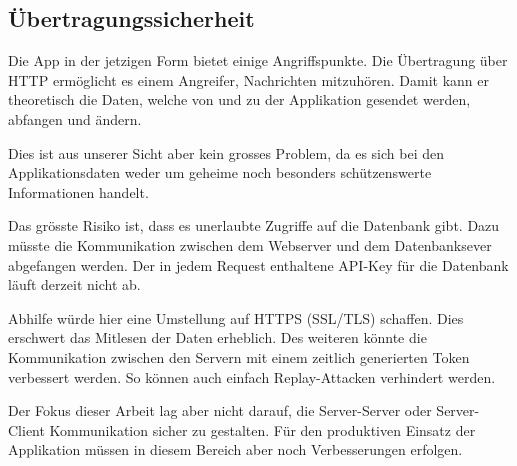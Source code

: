 \subsection{Übertragungssicherheit}
\label{uebertragunssicherheit}
Die App in der jetzigen Form bietet einige Angriffspunkte.
Die Übertragung über HTTP ermöglicht es einem Angreifer, Nachrichten mitzuhören.
Damit kann er theoretisch die Daten, welche von und zu der Applikation gesendet werden, abfangen und ändern.

Dies ist aus unserer Sicht aber kein grosses Problem, da es sich bei den Applikationsdaten weder um geheime noch besonders schützenswerte Informationen handelt.

Das grösste Risiko ist, dass es unerlaubte Zugriffe auf die Datenbank gibt.
Dazu müsste die Kommunikation zwischen dem Webserver und dem Datenbanksever abgefangen werden.
Der in jedem Request enthaltene \gls{API}-Key für die Datenbank läuft derzeit nicht ab.

Abhilfe würde hier eine Umstellung auf HTTPS (SSL/TLS) schaffen.
Dies erschwert das Mitlesen der Daten erheblich.
Des weiteren könnte die Kommunikation zwischen den Servern mit einem zeitlich generierten Token verbessert werden.
So können auch einfach Replay-Attacken verhindert werden.

Der Fokus dieser Arbeit lag aber nicht darauf, die Server-Server oder Server-Client Kommunikation sicher zu gestalten.
Für den produktiven Einsatz der Applikation müssen in diesem Bereich aber noch Verbesserungen erfolgen.
